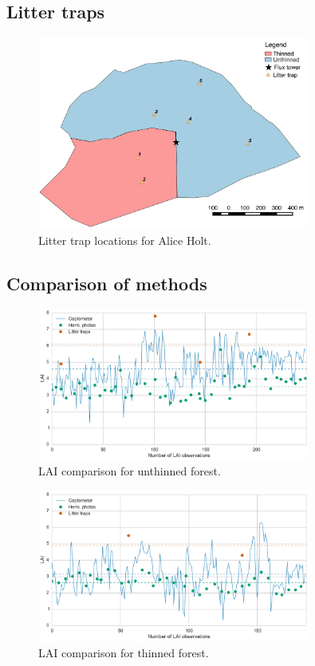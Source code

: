 \documentclass[11pt]{article}
\begin{document}
\subsection{Litter traps}

\begin{figure}[ht]
    \centering
    \includegraphics[width=0.8\textwidth]{litter_trap.pdf}
    \caption{Litter trap locations for Alice Holt.} \label{fig:lit_traps}
\end{figure}


\subsection{Comparison of methods}

\begin{figure}[ht]
    \centering
    \includegraphics[width=0.8\textwidth]{thinned07.pdf}
    \caption{LAI comparison for unthinned forest.} \label{fig:lai_comp07}
\end{figure}

\begin{figure}[ht]
    \centering
    \includegraphics[width=0.8\textwidth]{thinned14.pdf}
    \caption{LAI comparison for thinned forest.} \label{fig:lai_comp14}
\end{figure}
\end{document}

